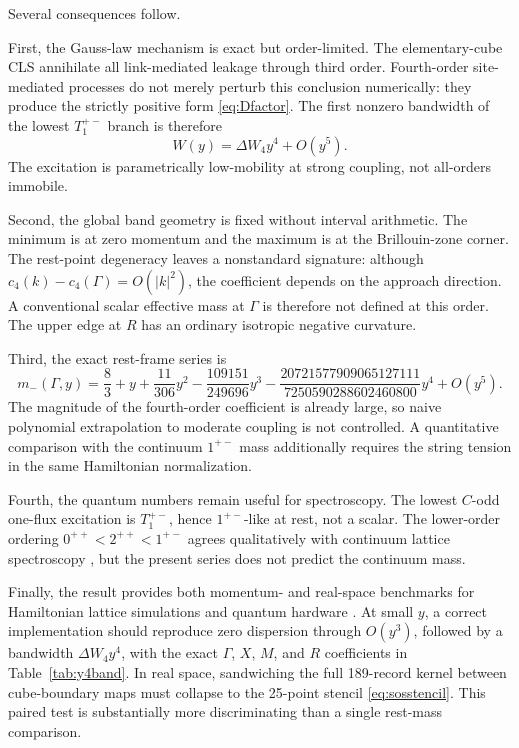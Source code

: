 \documentclass[11pt]{article}
\begin{document}
Several consequences follow.

First, the Gauss-law mechanism is exact but order-limited. The elementary-cube
CLS annihilate all link-mediated leakage through third order. Fourth-order
site-mediated processes do not merely perturb this conclusion numerically:
they produce the strictly positive form \eqref{eq:Dfactor}. The first
nonzero bandwidth of the lowest $T_1^{+-}$ branch is therefore
\[
W(y)=\Delta W_4y^4+O(y^5).
\]
The excitation is parametrically low-mobility at strong coupling, not
all-orders immobile.

Second, the global band geometry is fixed without interval arithmetic. The
minimum is at zero momentum and the maximum is at the Brillouin-zone corner.
The rest-point degeneracy leaves a nonstandard signature: although
$c_4(k)-c_4(\Gamma)=O(|k|^2)$, the coefficient depends on the approach
direction. A conventional scalar effective mass at $\Gamma$ is therefore
not defined at this order. The upper edge at $R$ has an ordinary isotropic
negative curvature.

Third, the exact rest-frame series is
\begin{equation}
m_-(\Gamma,y)=\frac83+y+\frac{11}{306}y^2
-\frac{109151}{249696}y^3
-\frac{20721577909065127111}{7250590288602460800}y^4+O(y^5).
\label{eq:restseries4}
\end{equation}
The magnitude of the fourth-order coefficient is already large, so naive
polynomial extrapolation to moderate coupling is not controlled. A
quantitative comparison with the continuum $1^{+-}$ mass additionally
requires the string tension in the same Hamiltonian normalization.

Fourth, the quantum numbers remain useful for spectroscopy. The lowest
$C$-odd one-flux excitation is $T_1^{+-}$, hence $1^{+-}$-like at rest, not
a scalar. The lower-order ordering $0^{++}<2^{++}<1^{+-}$ agrees
qualitatively with continuum lattice spectroscopy
\cite{MorningstarPeardon1999,AthenodorouTeper2020}, but the present series
does not predict the continuum mass.

Finally, the result provides both momentum- and real-space benchmarks for
Hamiltonian lattice simulations and quantum hardware \cite{Baueretal2023}.
At small $y$, a correct implementation should reproduce zero dispersion
through $O(y^3)$, followed by a bandwidth $\Delta W_4y^4$, with the exact
$\Gamma$, $X$, $M$, and $R$ coefficients in Table~\ref{tab:y4band}. In real
space, sandwiching the full 189-record kernel between cube-boundary maps must
collapse to the 25-point stencil \eqref{eq:sosstencil}. This paired test is
substantially more discriminating than a single rest-mass comparison.
\end{document}
